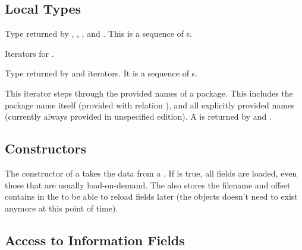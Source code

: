\documentclass[10pt]{article}
\begin{document}

\subsection{Local Types}

Type returned by , , ,
and . This is a sequence of s.

Iterators for .

Type returned by  and iterators. It is a sequence of
s.

This iterator steps through the provided names of a package. This
includes the package name itself (provided with relation
\val{= }), and all explicitly provided names (currently
always provided in unspecified edition). A 
is returned by  and .



\subsection{Constructors}

The constructor of a  takes the data from a
. If  is true, all fields are loaded,
even those that are usually load-on-demand. The  also
stores the filename and offset contains in the  to be
able to reload fields later (the  objects doesn't need
to exist anymore at this point of time).


\subsection{Access to Information Fields}
\end{document}
